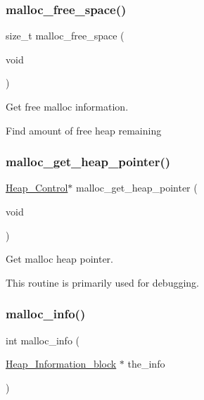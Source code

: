 \subsubsection{\texorpdfstring{malloc\_free\_space()}{malloc\_free\_space()}}
{\footnotesize\ttfamily size\+\_\+t malloc\+\_\+free\+\_\+space (\begin{DoxyParamCaption}\item[{void}]{ }\end{DoxyParamCaption})}



Get free malloc information. 

Find amount of free heap remaining \mbox{\label{group__libcsupport_ga07f9ec5c7348c131b6f61e503ba3a35e}} 
\subsubsection{\texorpdfstring{malloc\_get\_heap\_pointer()}{malloc\_get\_heap\_pointer()}}
{\footnotesize\ttfamily \mbox{\hyperlink{structHeap__Control}{Heap\+\_\+\+Control}}$\ast$ malloc\+\_\+get\+\_\+heap\+\_\+pointer (\begin{DoxyParamCaption}\item[{void}]{ }\end{DoxyParamCaption})}



Get malloc heap pointer. 

This routine is primarily used for debugging. \mbox{\label{group__libcsupport_ga223e58622d39e49bb8b26b6846cb8c28}} 
\subsubsection{\texorpdfstring{malloc\_info()}{malloc\_info()}}
{\footnotesize\ttfamily int malloc\+\_\+info (\begin{DoxyParamCaption}\item[{\mbox{\hyperlink{structHeap__Information__block}{Heap\+\_\+\+Information\+\_\+block}} $\ast$}]{the\+\_\+info }\end{DoxyParamCaption})}



